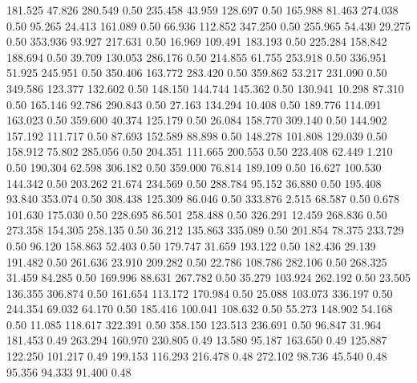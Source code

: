  181.525   47.826  280.549         0.50
 235.458   43.959  128.697         0.50
 165.988   81.463  274.038         0.50
  95.265   24.413  161.089         0.50
  66.936  112.852  347.250         0.50
 255.965   54.430   29.275         0.50
 353.936   93.927  217.631         0.50
  16.969  109.491  183.193         0.50
 225.284  158.842  188.694         0.50
  39.709  130.053  286.176         0.50
 214.855   61.755  253.918         0.50
 336.951   51.925  245.951         0.50
 350.406  163.772  283.420         0.50
 359.862   53.217  231.090         0.50
 349.586  123.377  132.602         0.50
 148.150  144.744  145.362         0.50
 130.941   10.298   87.310         0.50
 165.146   92.786  290.843         0.50
  27.163  134.294   10.408         0.50
 189.776  114.091  163.023         0.50
 359.600   40.374  125.179         0.50
  26.084  158.770  309.140         0.50
 144.902  157.192  111.717         0.50
  87.693  152.589   88.898         0.50
 148.278  101.808  129.039         0.50
 158.912   75.802  285.056         0.50
 204.351  111.665  200.553         0.50
 223.408   62.449    1.210         0.50
 190.304   62.598  306.182         0.50
 359.000   76.814  189.109         0.50
  16.627  100.530  144.342         0.50
 203.262   21.674  234.569         0.50
 288.784   95.152   36.880         0.50
 195.408   93.840  353.074         0.50
 308.438  125.309   86.046         0.50
 333.876    2.515   68.587         0.50
   0.678  101.630  175.030         0.50
 228.695   86.501  258.488         0.50
 326.291   12.459  268.836         0.50
 273.358  154.305  258.135         0.50
  36.212  135.863  335.089         0.50
 201.854   78.375  233.729         0.50
  96.120  158.863   52.403         0.50
 179.747   31.659  193.122         0.50
 182.436   29.139  191.482         0.50
 261.636   23.910  209.282         0.50
  22.786  108.786  282.106         0.50
 268.325   31.459   84.285         0.50
 169.996   88.631  267.782         0.50
  35.279  103.924  262.192         0.50
  23.505  136.355  306.874         0.50
 161.654  113.172  170.984         0.50
  25.088  103.073  336.197         0.50
 244.354   69.032   64.170         0.50
 185.416  100.041  108.632         0.50
  55.273  148.902   54.168         0.50
  11.085  118.617  322.391         0.50
 358.150  123.513  236.691         0.50
  96.847   31.964  181.453         0.49
 263.294  160.970  230.805         0.49
  13.580   95.187  163.650         0.49
 125.887  122.250  101.217         0.49
 199.153  116.293  216.478         0.48
 272.102   98.736   45.540         0.48
  95.356   94.333   91.400         0.48
